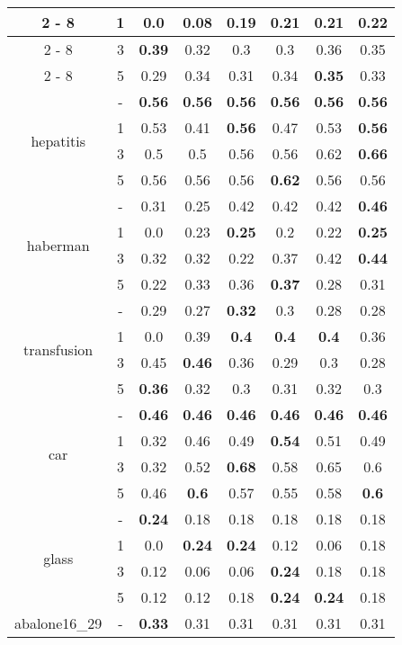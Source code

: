 \documentclass{article}%
\begin{document}
\begin{longtable}{c|c|cccccc}
\cline{2%
-%
8}%
&1&0.0&0.08&0.19&0.21&0.21&\textbf{0.22}\\%
\cline{2%
-%
8}%
&3&\textbf{0.39}&0.32&0.3&0.3&0.36&0.35\\%
\cline{2%
-%
8}%
&5&0.29&0.34&0.31&0.34&\textbf{0.35}&0.33\\%
\hline%
\multirow{4}{*}{hepatitis}&{-}&\textbf{0.56}&\textbf{0.56}&\textbf{0.56}&\textbf{0.56}&\textbf{0.56}&\textbf{0.56}\\%
\cline{2%
-%
8}%
&1&0.53&0.41&\textbf{0.56}&0.47&0.53&\textbf{0.56}\\%
\cline{2%
-%
8}%
&3&0.5&0.5&0.56&0.56&0.62&\textbf{0.66}\\%
\cline{2%
-%
8}%
&5&0.56&0.56&0.56&\textbf{0.62}&0.56&0.56\\%
\hline%
\multirow{4}{*}{haberman}&{-}&0.31&0.25&0.42&0.42&0.42&\textbf{0.46}\\%
\cline{2%
-%
8}%
&1&0.0&0.23&\textbf{0.25}&0.2&0.22&\textbf{0.25}\\%
\cline{2%
-%
8}%
&3&0.32&0.32&0.22&0.37&0.42&\textbf{0.44}\\%
\cline{2%
-%
8}%
&5&0.22&0.33&0.36&\textbf{0.37}&0.28&0.31\\%
\hline%
\multirow{4}{*}{transfusion}&{-}&0.29&0.27&\textbf{0.32}&0.3&0.28&0.28\\%
\cline{2%
-%
8}%
&1&0.0&0.39&\textbf{0.4}&\textbf{0.4}&\textbf{0.4}&0.36\\%
\cline{2%
-%
8}%
&3&0.45&\textbf{0.46}&0.36&0.29&0.3&0.28\\%
\cline{2%
-%
8}%
&5&\textbf{0.36}&0.32&0.3&0.31&0.32&0.3\\%
\hline%
\multirow{4}{*}{car}&{-}&\textbf{0.46}&\textbf{0.46}&\textbf{0.46}&\textbf{0.46}&\textbf{0.46}&\textbf{0.46}\\%
\cline{2%
-%
8}%
&1&0.32&0.46&0.49&\textbf{0.54}&0.51&0.49\\%
\cline{2%
-%
8}%
&3&0.32&0.52&\textbf{0.68}&0.58&0.65&0.6\\%
\cline{2%
-%
8}%
&5&0.46&\textbf{0.6}&0.57&0.55&0.58&\textbf{0.6}\\%
\hline%
\multirow{4}{*}{glass}&{-}&\textbf{0.24}&0.18&0.18&0.18&0.18&0.18\\%
\cline{2%
-%
8}%
&1&0.0&\textbf{0.24}&\textbf{0.24}&0.12&0.06&0.18\\%
\cline{2%
-%
8}%
&3&0.12&0.06&0.06&\textbf{0.24}&0.18&0.18\\%
\cline{2%
-%
8}%
&5&0.12&0.12&0.18&\textbf{0.24}&\textbf{0.24}&0.18\\%
\hline%
\multirow{4}{*}{abalone16\_29}&{-}&\textbf{0.33}&0.31&0.31&0.31&0.31&0.31\\%

\end{longtable}
\end{document}
